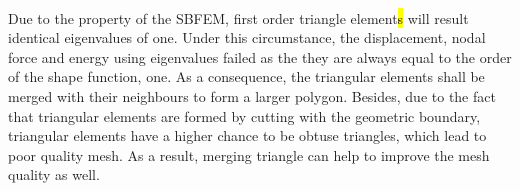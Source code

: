 
\paragraph{}
Due to the property of the SBFEM, first order triangle element\hl{s} will result identical eigenvalues of one.
Under this circumstance, the displacement, nodal force and energy using eigenvalues failed as the they are always equal to the order of the shape function, one.
As a consequence, the triangular elements shall be merged with their neighbours to form a larger polygon.
Besides, due to the fact that triangular elements are formed by cutting with the geometric boundary, triangular elements have a higher chance to be obtuse triangles, which lead to poor quality mesh.
As a result, merging triangle can help to improve the mesh quality as well.


